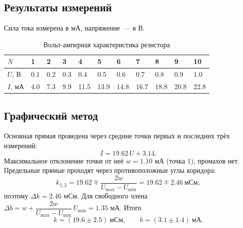 \documentclass[12pt]{article}
\begin{document}
    \subsection{Результаты измерений}

    Сила тока измерена в мА, напряжение~--- в В.

    \begin{table}[H]
        \centering
        \begin{xltabular}{\textwidth}{@{}XXXXXXXXXXX@{}}
            \toprule
            $N$ & 1 & 2 & 3 & 4 & 5 & 6 & 7 & 8 & 9 & 10\\
            \midrule
            $U$, В & 0.1 & 0.2 & 0.3 & 0.4 & 0.5 & 0.6 & 0.7 & 0.8 & 0.9 & 1.0\\
            $I$, мА & 4.0 & 7.3 & 9.9 & 11.5 & 13.9 & 14.8 & 16.7 & 18.8 & 20.8 & 22.8\\
            \bottomrule
        \end{xltabular}
        \caption{Вольт-амперная характеристика резистора}
    \end{table}

    \subsection{Графический метод}

    Основная прямая проведена через средние точки первых и последних трёх измерений:
    \[
    	I = 19.62\, U + 3.14.
    \]
    Максимальное отклонение точки от неё $w = 1.10$ мА (точка $1$), промахов нет. Предельные прямые проходят через противоположные углы коридора:
    \[
    	k_{1,2} = 19.62 \mp \frac{2w}{U_{\max} - U_{\min}} = 19.62 \mp 2.46 \ \text{мСм},
    \]
    поэтому $\varDelta k = 2.46$ мСм. Для свободного члена $\varDelta b = w + \dfrac{2w}{U_{\max} - U_{\min}}\,U_{\min} = 1.35$ мА. Итого
    \[
    	k = (19.6 \pm 2.5) \ \text{мСм}, \qquad b = (3.1 \pm 1.4) \ \text{мА}.
    \]
\end{document}
